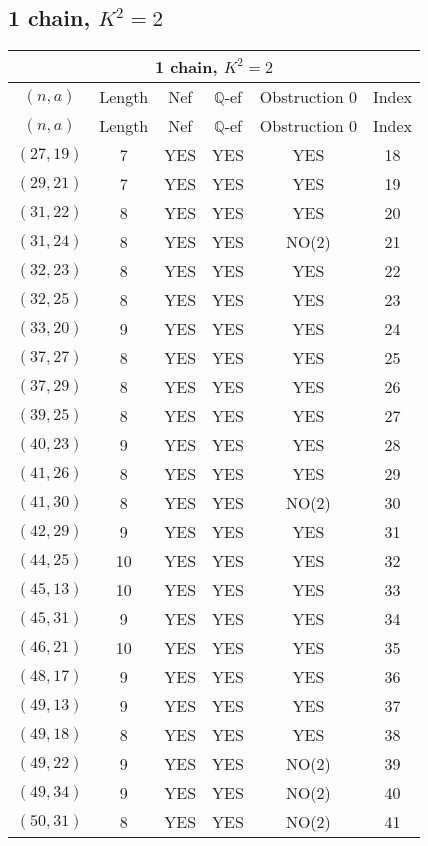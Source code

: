 \subsection{1 chain, $K^2 = 2$}
\begin{longtable}{|c|c|c|c|c|c|}
\hline
\multicolumn{6}{|c|}{1 chain, $K^2 = 2$}\\
\hline
$(n,a)$ & Length & Nef & $\mathbb Q$-ef & Obstruction 0 & Index\\
\hline
\endfirsthead

\hline
$(n,a)$ & Length & Nef & $\mathbb Q$-ef & Obstruction 0 & Index\\
\hline
\endhead
\hline
\endfoot

$(27, 19)$ & 7 & YES & YES & YES & 18\\
$(29, 21)$ & 7 & YES & YES & YES & 19\\
$(31, 22)$ & 8 & YES & YES & YES & 20\\
$(31, 24)$ & 8 & YES & YES & NO(2) & 21\\
$(32, 23)$ & 8 & YES & YES & YES & 22\\
$(32, 25)$ & 8 & YES & YES & YES & 23\\
$(33, 20)$ & 9 & YES & YES & YES & 24\\
$(37, 27)$ & 8 & YES & YES & YES & 25\\
$(37, 29)$ & 8 & YES & YES & YES & 26\\
$(39, 25)$ & 8 & YES & YES & YES & 27\\
$(40, 23)$ & 9 & YES & YES & YES & 28\\
$(41, 26)$ & 8 & YES & YES & YES & 29\\
$(41, 30)$ & 8 & YES & YES & NO(2) & 30\\
$(42, 29)$ & 9 & YES & YES & YES & 31\\
$(44, 25)$ & 10 & YES & YES & YES & 32\\
$(45, 13)$ & 10 & YES & YES & YES & 33\\
$(45, 31)$ & 9 & YES & YES & YES & 34\\
$(46, 21)$ & 10 & YES & YES & YES & 35\\
$(48, 17)$ & 9 & YES & YES & YES & 36\\
$(49, 13)$ & 9 & YES & YES & YES & 37\\
$(49, 18)$ & 8 & YES & YES & YES & 38\\
$(49, 22)$ & 9 & YES & YES & NO(2) & 39\\
$(49, 34)$ & 9 & YES & YES & NO(2) & 40\\
$(50, 31)$ & 8 & YES & YES & NO(2) & 41\\

\end{longtable}
